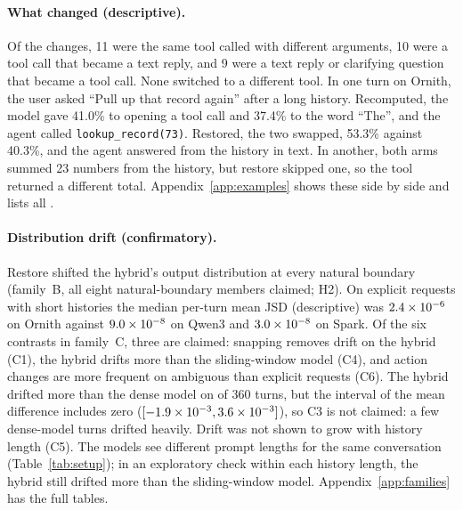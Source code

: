 \paragraph{What changed (descriptive).}
Of the \ChangesTotal{} changes, 11 were the same tool called with different
arguments, 10 were a tool call that became a text reply, and 9 were a text
reply or clarifying question that became a tool call. None switched to a
different tool. In one turn on Ornith, the user asked ``Pull up that record
again'' after a long history. Recomputed, the model gave 41.0\% to opening a
tool call and 37.4\% to the word ``The'', and the agent called
\texttt{lookup\_record(73)}. Restored, the two swapped, 53.3\% against 40.3\%,
and the agent answered from the history in text. In another, both arms summed
23 numbers from the history, but restore skipped one, so the tool returned a
different total. Appendix~\ref{app:examples} shows these side by side and
lists all \ChangesTotal{}.

\paragraph{Distribution drift (confirmatory).}
Restore shifted the hybrid's output distribution at every natural boundary
(family~B, all eight natural-boundary members claimed; H2). On explicit
requests with short histories the median per-turn mean JSD (descriptive) was
$2.4\times10^{-6}$ on Ornith against $9.0\times10^{-8}$ on Qwen3 and
$3.0\times10^{-8}$ on Spark. Of the six contrasts in family~C, three are
claimed: snapping removes drift on the hybrid (C1), the hybrid drifts more than
the sliding-window model (C4), and action changes are more frequent on
ambiguous than explicit requests (C6). The hybrid drifted more than the dense
model on \CThreePos{} of 360 turns, but the interval of the mean difference
includes zero ($[-1.9\times10^{-3}, 3.6\times10^{-3}]$), so C3 is not claimed: a few
dense-model turns drifted heavily. Drift was not shown
to grow with history length (C5). The models see different prompt lengths for
the same conversation (Table~\ref{tab:setup}); in an exploratory check within
each history length, the hybrid still drifted more than the sliding-window
model.
Appendix~\ref{app:families} has the full tables.

